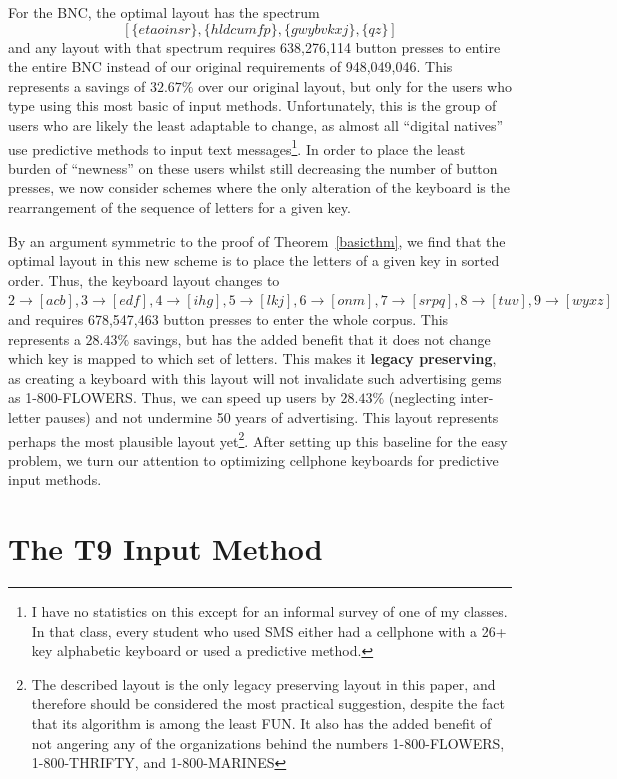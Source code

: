 \documentclass[runningheads]{llncs}
\newcommand{\newword}[1]{{\bf #1}}
\begin{document}
For the BNC, the optimal layout has the spectrum 
$$[\{etaoinsr\}, \{hldcumfp\}, \{gwybvkxj\}, \{qz\}]$$
and any layout with that spectrum requires 638,276,114 button presses to
entire the entire BNC instead of our original requirements of
948,049,046.  This represents a savings of $32.67\%$ over our original
layout, but only for the users who type using this most basic of
input methods.  Unfortunately, this is the group of users who are likely
the least adaptable to change, as almost all ``digital natives'' use 
predictive methods to input text messages\footnote{I have no statistics
on this except for an informal survey of one of my classes.  In that
class, every student who used SMS either had a cellphone with a 26+
key alphabetic keyboard or used a predictive method.}.  In order to place the
least burden of ``newness'' on these users whilst still decreasing the number
of button presses, we now consider schemes where the only alteration of the
keyboard is the rearrangement of the sequence of letters for a given key.

By an argument symmetric to the proof of Theorem~\ref{basicthm}, we find that
the optimal layout in this new scheme is to place the letters of a given key in
sorted order.  Thus, the keyboard layout changes to $2\to[acb], 3\to[edf],
4\to[ihg], 5\to[lkj], 6\to[onm], 7\to[srpq], 8\to[tuv], 9\to[wyxz]$ and
requires 678,547,463 button presses to enter the whole corpus.  This represents
a $28.43\%$ savings, but has the added benefit that it does not change which
key is mapped to which set of letters.  This makes it \newword{legacy
preserving}, as creating a keyboard with this layout will not invalidate such
advertising gems as 1-800-FLOWERS.  Thus, we can speed up users by $28.43\%$
(neglecting inter-letter pauses) and not undermine 50 years of advertising.
This layout represents perhaps the most plausible layout yet\footnote{The
described layout is the only legacy preserving layout in this paper, and
therefore should be considered the most practical suggestion, despite the fact
that its algorithm is among the least FUN.  It also has the added benefit of
not angering any of the organizations behind the numbers 1-800-FLOWERS,
1-800-THRIFTY, and 1-800-MARINES}.  After setting up this baseline for the easy
problem, we turn our attention to optimizing cellphone keyboards for predictive
input methods.

\section{The T9 Input Method}
\end{document}
